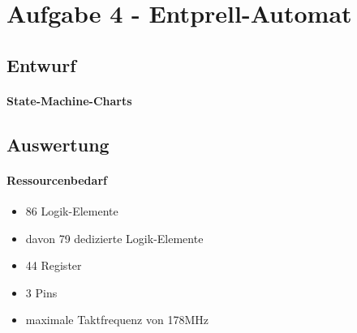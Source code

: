 \section{Aufgabe 4 - Entprell-Automat}
\subsection{Entwurf}
\paragraph{State-Machine-Charts}

\subsection{Auswertung}
\paragraph{Ressourcenbedarf}
\begin{itemize} 
\item 86 Logik-Elemente
\item davon 79 dedizierte Logik-Elemente
\item 44 Register
\item 3 Pins 
\item maximale Taktfrequenz von 178MHz
\end{itemize}
